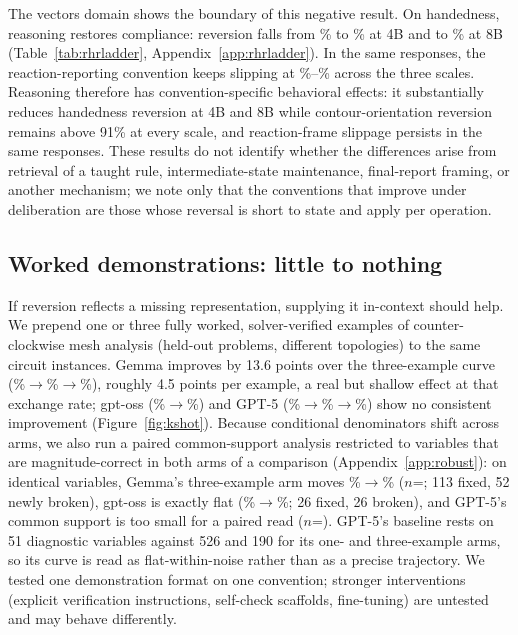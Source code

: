 \documentclass{article}
\begin{document}
\begin{table}[t]
\centering\small
\caption{The Qwen3 reasoning toggle on contour: competence rises at every scale;
orientation reversion does not follow.}
\label{tab:c1}

\end{table}

The vectors domain shows the boundary of this negative result. On handedness,
reasoning restores compliance: reversion falls from \vLhNothinkMid\% to
\vLhThinkMid\% at 4B and to \vLhThinkBig\% at 8B
(Table~\ref{tab:rhrladder}, Appendix~\ref{app:rhrladder}). In the same responses,
the reaction-reporting convention keeps slipping at
\vRxnThinkBig\%--\vRxnThinkSmall\% across the three scales. Reasoning therefore has convention-specific behavioral effects: it substantially
reduces handedness reversion at 4B and 8B while contour-orientation reversion
remains above 91\% at every scale, and reaction-frame slippage persists in the
same responses. These results do not identify whether the differences arise from
retrieval of a taught rule, intermediate-state maintenance, final-report framing,
or another mechanism; we note only that the conventions that improve under
deliberation are those whose reversal is short to state and apply per operation.

\subsection{Worked demonstrations: little to nothing}
If reversion reflects a missing representation, supplying it in-context should
help. We prepend one or three fully worked, solver-verified examples of
counter-clockwise mesh analysis (held-out problems, different topologies) to the
same circuit instances. Gemma improves by 13.6 points over the three-example
curve (\vShotZeroGemma\%$\to$\vShotOneGemma\%$\to$\vShotThreeGemma\%), roughly
4.5 points per example, a real but shallow effect at that exchange rate; gpt-oss
(\vShotZeroGptOss\%$\to$\vShotThreeGptOss\%) and GPT-5
(\vShotZeroGptFive\%$\to$\vShotOneGptFive\%$\to$\vShotThreeGptFive\%) show no
consistent improvement (Figure~\ref{fig:kshot}). Because conditional denominators
shift across arms, we also run a paired common-support analysis restricted to
variables that are magnitude-correct in both arms of a comparison
(Appendix~\ref{app:robust}): on identical variables, Gemma's three-example arm
moves \csShotThreeBaseGemma\%$\to$\csShotThreeArmGemma\% ($n$=\csShotThreeNGemma;
113 fixed, 52 newly broken), gpt-oss is exactly flat
(\csShotThreeBaseGptOss\%$\to$\csShotThreeArmGptOss\%; 26 fixed, 26 broken), and
GPT-5's common support is too small for a paired read
($n$=\csShotThreeNGptFive). GPT-5's baseline rests on 51 diagnostic
variables against 526 and 190 for its one- and three-example arms, so its curve
is read as flat-within-noise rather than as a precise trajectory. We tested one
demonstration format on one convention; stronger interventions (explicit
verification instructions, self-check scaffolds, fine-tuning) are untested and
may behave differently.
\end{document}
